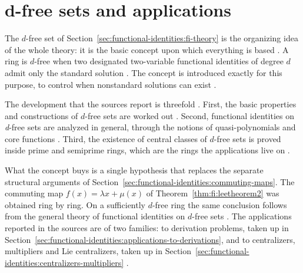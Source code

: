 \section{d-free sets and applications}\label{sec:functional-identities:d-free}

The $d$-free set of
Section~\ref{sec:functional-identities:fi-theory} is the organizing idea
of the whole theory: it is the basic concept upon which everything is
based \cite[p.~x]{BresarMartindaleChebotar2007FI}. A ring is $d$-free when
two designated two-variable functional identities of degree $d$ admit only
the standard solution \cite[p.~21]{BresarMartindaleChebotar2007FI}. The
concept is introduced exactly for this purpose, to control when
nonstandard solutions can exist
\cite[p.~21]{BresarMartindaleChebotar2007FI}.

The development that the sources report is threefold
\cite[p.~x]{BresarMartindaleChebotar2007FI}. First, the basic properties
and constructions of $d$-free sets are worked out
\cite[p.~x]{BresarMartindaleChebotar2007FI}. Second, functional
identities on \emph{d}-free sets are analyzed in general, through the
notions of quasi-polynomials and core functions
\cite[p.~x]{BresarMartindaleChebotar2007FI}. Third, the existence of
central classes of $d$-free sets is proved inside prime and semiprime
rings, which are the rings the applications live on
\cite[p.~x]{BresarMartindaleChebotar2007FI}.

What the concept buys is a single hypothesis that replaces the separate
structural arguments of
Section~\ref{sec:functional-identities:commuting-maps}. The commuting map
$f(x)=\lambda x+\mu(x)$ of Theorem~\ref{thm:fi:leetheorem2} was obtained
ring by ring. On a sufficiently $d$-free ring the same conclusion follows
from the general theory of functional identities on $d$-free sets
\cite[p.~x]{BresarMartindaleChebotar2007FI}. The applications reported in
the sources are of two families: to derivation problems, taken up in
Section~\ref{sec:functional-identities:applications-to-derivations}, and
to centralizers, multipliers and Lie centralizers, taken up in
Section~\ref{sec:functional-identities:centralizers-multipliers}
\cite[p.~x]{BresarMartindaleChebotar2007FI}.
